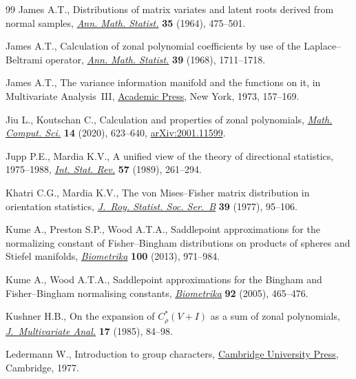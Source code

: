 \documentclass[11pt]{article}
\numberwithin{equation}{section}
\numberwithin{equation}{section}
\begin{document}
\begin{thebibliography}{99}
James A.T., Distributions of matrix variates and latent roots derived from
 normal samples, \href{https://doi.org/10.1214/aoms/1177703550}{\textit{Ann. Math. Statist.}} \textbf{35} (1964), 475--501.

James A.T., Calculation of zonal polynomial coefficients by use of the
 {L}aplace--{B}eltrami operator, \href{https://doi.org/10.1214/aoms/1177698153}{\textit{Ann. Math. Statist.}} \textbf{39}
 (1968), 1711--1718.

James A.T., The variance information manifold and the functions on it, in
 Multivariate {A}nalysis~{III}, \href{https://doi.org/10.1016/B978-0-12-426653-7.50016-8}{Academic Press}, New York, 1973, 157--169.

Jiu L., Koutschan C., Calculation and properties of zonal polynomials,
 \href{https://doi.org/10.1007/s11786-020-00458-0}{\textit{Math. Comput. Sci.}} \textbf{14} (2020), 623--640,
 \href{https://arxiv.org/abs/2001.11599}{arXiv:2001.11599}.

Jupp P.E., Mardia K.V., A unified view of the theory of directional statistics,
 1975--1988, \href{https://doi.org/10.2307/1403799}{\textit{Int. Stat. Rev.}} \textbf{57} (1989), 261--294.

Khatri C.G., Mardia K.V., The von {M}ises--{F}isher matrix distribution in
 orientation statistics, \href{https://doi.org/10.1111/j.2517-6161.1977.tb01610.x}{\textit{J.~Roy. Statist. Soc. Ser.~B}} \textbf{39}
 (1977), 95--106.

Kume A., Preston S.P., Wood A.T.A., Saddlepoint approximations for the
 normalizing constant of {F}isher--{B}ingham distributions on products of
 spheres and {S}tiefel manifolds, \href{https://doi.org/10.1093/biomet/ast021}{\textit{Biometrika}} \textbf{100} (2013),
 971--984.

Kume A., Wood A.T.A., Saddlepoint approximations for the {B}ingham and
 {F}isher--{B}ingham normalising constants, \href{https://doi.org/10.1093/biomet/92.2.465}{\textit{Biometrika}} \textbf{92}
 (2005), 465--476.

Kushner H.B., On the expansion of {$C^*_\rho(V+I)$} as a sum of zonal
 polynomials, \href{https://doi.org/10.1016/0047-259X(85)90096-X}{\textit{J.~Multivariate Anal.}} \textbf{17} (1985), 84--98.

Ledermann W., Introduction to group characters, \href{https://doi.org/10.1017/CBO9780511565755}{Cambridge University Press},
 Cambridge, 1977.


\end{thebibliography}
\end{document}
